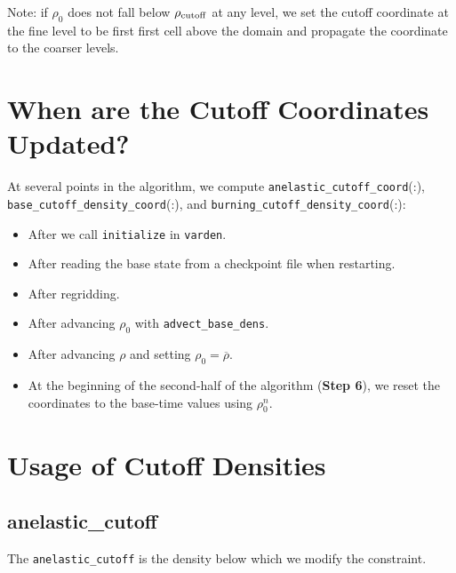 Note: if $\rho_0$ does not fall below $\rho_{\rm cutoff}$ at any level, we set the cutoff 
coordinate at the fine level to be first first cell above the domain and propagate the 
coordinate to the coarser levels.

\section{When are the Cutoff Coordinates Updated?}

At several points in the algorithm, we compute {\tt anelastic\_cutoff\_coord}(:), 
{\tt base\_cutoff\_density\_coord}(:), and {\tt burning\_cutoff\_density\_coord}(:):

\begin{itemize}

\item After we call {\tt initialize} in {\tt varden}.

\item After reading the base state from a checkpoint file when restarting.

\item After regridding.

\item After advancing $\rho_0$ with {\tt advect\_base\_dens}.

\item After advancing $\rho$ and setting $\rho_0 = \overline{\rho}$.

\item At the beginning of the second-half of the algorithm ({\bf Step 6}), we reset
  the coordinates to the base-time values using $\rho_0^n$.

\end{itemize}

\section{Usage of Cutoff Densities}

\subsection{anelastic\_cutoff}\label{Sec:Anelastic Cutoff}

The {\tt anelastic\_cutoff} is the density below which we modify the constraint.


